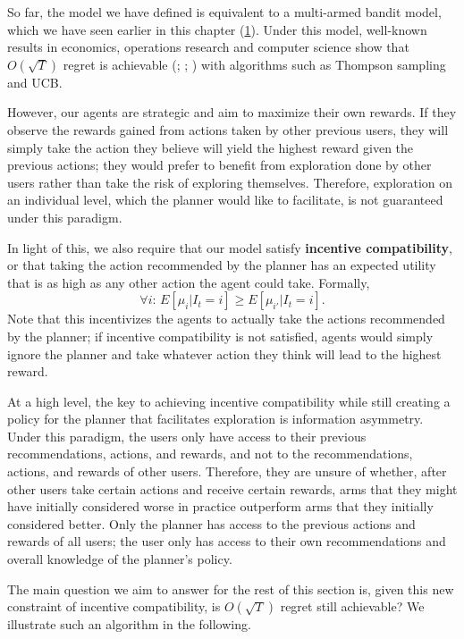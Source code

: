 \documentclass[
  letterpaper,
  numbers=noenddot,
  DIV=11,
  oneside]{scrreprt}
\theoremstyle{remark}
\begin{document}
So far, the model we have defined is equivalent to a multi-armed bandit
model, which we have seen earlier in this chapter
(\hyperref[4optim]{1}). Under this model, well-known results in
economics, operations research and computer science show that
\(O(\sqrt{T})\) regret is achievable
(; ; ) with algorithms such as Thompson sampling and UCB.

However, our agents are strategic and aim to maximize their own rewards.
If they observe the rewards gained from actions taken by other previous
users, they will simply take the action they believe will yield the
highest reward given the previous actions; they would prefer to benefit
from exploration done by other users rather than take the risk of
exploring themselves. Therefore, exploration on an individual level,
which the planner would like to facilitate, is not guaranteed under this
paradigm.

In light of this, we also require that our model satisfy
\textbf{incentive compatibility}, or that taking the action recommended
by the planner has an expected utility that is as high as any other
action the agent could take. Formally,
\[\forall i : \, E[\mu_i | I_t = i] \geq E[\mu_{i'} | I_t = i].\] Note
that this incentivizes the agents to actually take the actions
recommended by the planner; if incentive compatibility is not satisfied,
agents would simply ignore the planner and take whatever action they
think will lead to the highest reward.

At a high level, the key to achieving incentive compatibility while
still creating a policy for the planner that facilitates exploration is
information asymmetry. Under this paradigm, the users only have access
to their previous recommendations, actions, and rewards, and not to the
recommendations, actions, and rewards of other users. Therefore, they
are unsure of whether, after other users take certain actions and
receive certain rewards, arms that they might have initially considered
worse in practice outperform arms that they initially considered better.
Only the planner has access to the previous actions and rewards of all
users; the user only has access to their own recommendations and overall
knowledge of the planner's policy.

The main question we aim to answer for the rest of this section is,
given this new constraint of incentive compatibility, is \(O(\sqrt{T})\)
regret still achievable? We illustrate such an algorithm in the
following.
\end{document}
